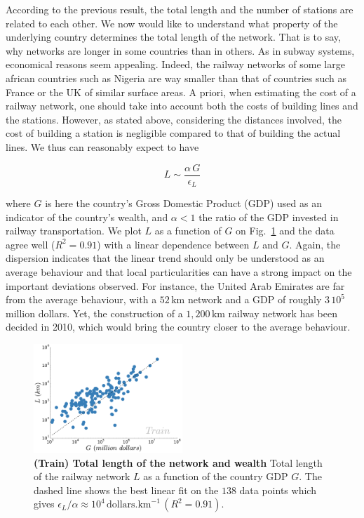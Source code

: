 According to the previous result, the total length and the number of stations
are related to each other. We now would like to understand what property of the
underlying country determines the total length of the network. That is to say,
why networks are longer in some countries than in others. As in subway systems,
economical reasons seem appealing. Indeed, the railway networks of some large
african countries such as Nigeria are way smaller than that of countries such as
France or the UK of similar surface areas. A priori, when estimating the cost of
a railway network, one should take into account both the costs of building lines
and the stations. However, as stated above, considering the distances involved,
the cost of building a station is negligible compared to that of building the
actual lines. We thus can reasonably expect to have

\begin{equation} L \sim \frac{\alpha\,G}{\epsilon_L} \end{equation}

where $G$ is here the country's Gross Domestic Product (GDP) used as an
indicator of the country's wealth, and $\alpha < 1$ the ratio of the GDP
invested in railway transportation. We plot $L$ as a function of $G$ on
Fig.~\ref{fig:length-gdp} and the data agree well ($R^2 = 0.91$) with a linear
dependence between $L$ and $G$. Again, the dispersion indicates that the linear
trend should only be understood as an average behaviour and that local
particularities can have a strong impact on the important deviations observed.
For instance, the United Arab Emirates are far from the average behaviour, with
a $52\,\text{km}$ network and a GDP of roughly $3\,10^5$ million dollars. Yet,
the construction of a $1,200\,\text{km}$ railway network has been decided in
2010, which would bring the country closer to the average behaviour. 

\begin{figure}
    \centering
    \includegraphics[width=0.5\textwidth]{gfx/chapter-networks/rail_length_gdp.pdf}
    \caption{{\bf(Train) Total length of the network and wealth} Total length of the railway network $L$ as a function of the country GDP $G$. The dashed line shows the best linear fit on the $138$ data points which gives $\epsilon_L / \alpha \approx 10^4\, \text{dollars.km}^{-1}\,(R^2 = 0.91)$.\label{fig:length-gdp}}
\end{figure}

